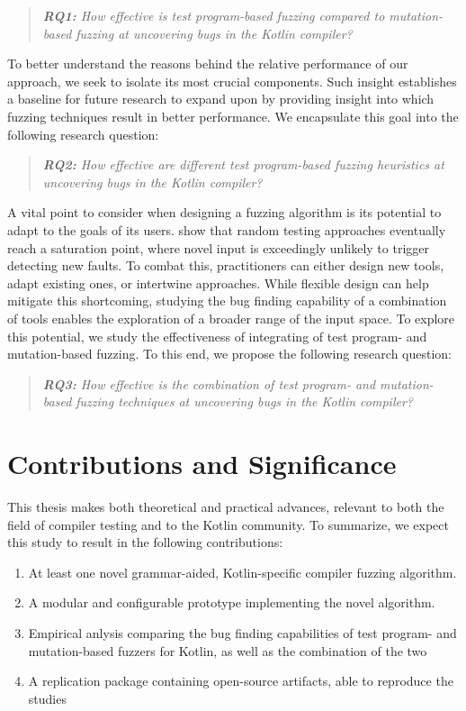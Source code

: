 \begin{quote}
\centering 
\emph{\textbf{RQ1:} How effective is test program-based
fuzzing compared to mutation-based fuzzing
at uncovering bugs in the Kotlin compiler?}
\end{quote}

To better understand the reasons behind the relative performance
of our approach, we seek to isolate its most crucial components.
Such insight establishes a baseline for future research to expand upon
by providing insight into which fuzzing techniques result in better performance.
We encapsulate this goal into the following research question:

\begin{quote}
\centering 
\emph{\textbf{RQ2:} How effective are different test program-based
fuzzing heuristics at uncovering bugs in the Kotlin compiler?}
\end{quote}

A vital point to consider when designing a fuzzing algorithm is
its potential to adapt to the goals of its users. \citet{amalfitano2015exploiting}
show that random testing approaches eventually reach a
saturation point, where novel input is exceedingly unlikely to trigger
detecting new faults. 
To combat this, practitioners can either design new tools, adapt existing
ones, or intertwine approaches.
While flexible design can help mitigate this shortcoming, studying the 
bug finding capability of a combination of tools enables
the exploration of a broader range of the input space.
To explore this potential, we study the effectiveness of 
integrating of test program- and mutation-based fuzzing.
To this end, we propose the following research question:

\begin{quote}
\centering 
\emph{\textbf{RQ3:} How effective is the combination of 
test program- and mutation-based fuzzing techniques at uncovering
bugs in the Kotlin compiler?}
\end{quote}

\section{Contributions and Significance}

This thesis makes both theoretical and practical advances,
relevant to both the field of compiler testing and to the 
Kotlin community. To summarize, we expect this
study to result in the following contributions:

\begin{enumerate}
	\item At least one novel grammar-aided, Kotlin-specific compiler fuzzing algorithm.
	\item A modular and configurable prototype implementing the novel algorithm.
	\item Empirical anlysis comparing the bug finding capabilities of test program- and mutation-based fuzzers for Kotlin, as well as the combination of the two
	\item A replication package containing open-source artifacts, able to reproduce the studies
\end{enumerate}

